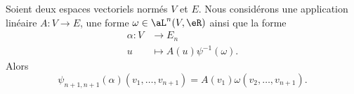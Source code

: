 \begin{lemma}       \label{LEMooDGUGooTXOtih}
	Soient deux espaces vectoriels normés \( V\) et \( E\). Nous considérons une application linéaire \( A\colon V\to E\), une forme \( \omega\in\aL^n(V,\eR)\) ainsi que la forme
	\begin{equation}
		\begin{aligned}
			\alpha\colon V & \to E_n                        \\
			u              & \mapsto A(u)\psi^{-1}(\omega).
		\end{aligned}
	\end{equation}
	Alors
	\begin{equation}
		\psi_{n+1,n+1}(\alpha)(v_1,\ldots, v_{n+1})=A(v_1)\omega(v_2,\ldots, v_{n+1}).
	\end{equation}
\end{lemma}

